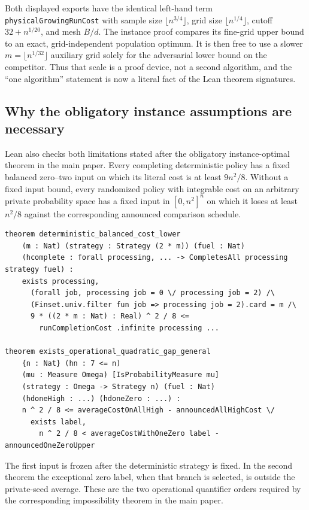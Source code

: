 Both displayed exports have the identical left-hand term
\texttt{physicalGrowingRunCost} with sample size
$\lfloor n^{3/4}\rfloor$, grid size $\lfloor n^{1/4}\rfloor$, cutoff
$32+n^{1/20}$, and mesh $B/d$.  The instance proof compares its fine-grid
upper bound to an exact, grid-independent population optimum.  It is then
free to use a slower $m=\lfloor n^{1/32}\rfloor$ auxiliary grid solely for
the adversarial lower bound on the competitor.  Thus that scale is a proof
device, not a second algorithm, and the ``one algorithm'' statement is now a
literal fact of the Lean theorem signatures.

\subsection{Why the obligatory instance assumptions are necessary}

Lean also checks both limitations stated after the obligatory
instance-optimal theorem in the main paper.  Every completing deterministic policy
has a fixed balanced zero--two input on which its literal cost is at least
$9n^2/8$.  Without a fixed input bound, every randomized policy with
integrable cost on an arbitrary private probability space
has a fixed input in $[0,n^2]^n$ on which it loses at least $n^2/8$ against
the corresponding announced comparison schedule.

\begin{lstlisting}[style=lean]
theorem deterministic_balanced_cost_lower
    (m : Nat) (strategy : Strategy (2 * m)) (fuel : Nat)
    (hcomplete : forall processing, ... -> CompletesAll processing strategy fuel) :
    exists processing,
      (forall job, processing job = 0 \/ processing job = 2) /\
      (Finset.univ.filter fun job => processing job = 2).card = m /\
      9 * ((2 * m : Nat) : Real) ^ 2 / 8 <=
        runCompletionCost .infinite processing ...

theorem exists_operational_quadratic_gap_general
    {n : Nat} (hn : 7 <= n)
    (mu : Measure Omega) [IsProbabilityMeasure mu]
    (strategy : Omega -> Strategy n) (fuel : Nat)
    (hdoneHigh : ...) (hdoneZero : ...) :
    n ^ 2 / 8 <= averageCostOnAllHigh - announcedAllHighCost \/
      exists label,
        n ^ 2 / 8 < averageCostWithOneZero label - announcedOneZeroUpper
\end{lstlisting}

The first input is frozen after the deterministic strategy is fixed.  In the
second theorem the exceptional zero label, when that branch is selected, is
outside the private-seed average.  These are the two operational quantifier
orders required by the corresponding impossibility theorem in the main paper.

